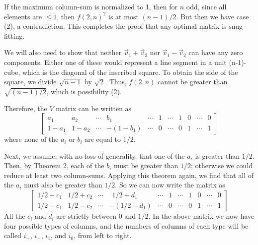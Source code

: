 If the maximum column-sum is normalized to 1, then for $n$ odd, since all
elements are $\leq 1$, then $f(2,n)^2$ is at most $(n-1)/2$.  But then we have
case (2), a contradiction.  This completes the proof that any optimal matrix
is snug-fitting.

We will also need to show that neither $\vec{v}_1 + \vec{v}_2$ nor $\vec{v}_1
- \vec{v}_2$ can have any zero components.  Either one of these would
represent a line segment in a unit (n-1)-cube, which is the diagonal of the
inscribed square.  To obtain the side of the square, we divide $\sqrt{n-1}$ by
$\sqrt{2}$.  Thus, $f(2,n)$ cannot be greater than $\sqrt{(n-1)/2}$, which is
possibility (2).

Therefore, the $V$ matrix can be written as
\begin{equation*}
\left[
\begin{array}{ccc|cc|ccc|ccc}

a_1   & a_2   & \cdots & b_1      & \cdots & 1 & \cdots & 1 & 0 & \cdots & 0 \\
1-a_1 & 1-a_2 & \cdots & -(1-b_1) & \cdots & 0 & \cdots & 0 & 1 & \cdots & 1

\end{array}
\right]
\end{equation*}
where none of the $a_i$ or $b_i$ are equal to $1/2$.

Next, we assume, with no loss of generality, that one of the $a_i$ is greater
than $1/2$.  Then, by Theorem 2, each of the $b_i$ must be greater than $1/2$;
otherwise we could reduce at least two column-sums.  Applying this theorem
again, we find that all of the $a_i$ must also be greater than $1/2$.  So we
can now write the matrix as
\begin{equation*}
\left[
\begin{array}{ccc|cc|ccc|ccc}

1/2 + c_1 & 1/2 + c_2 & \cdots & ~~1/2 + d_1  & \cdots & 1 & \cdots & 1 & 0 & \cdots & 0 \\
1/2 - c_1 & 1/2 - c_2 & \cdots & -(1/2 - d_1) & \cdots & 0 & \cdots & 0 & 1 & \cdots & 1

\end{array}
\right]
\end{equation*}
All the $c_i$ and $d_i$ are strictly between $0$ and $1/2$.  In the above
matrix we now have four possible types of columns, and the numbers of columns
of each type will be called $i_+$, $i_-$, $i_1$, and $i_0$, from left to right.

